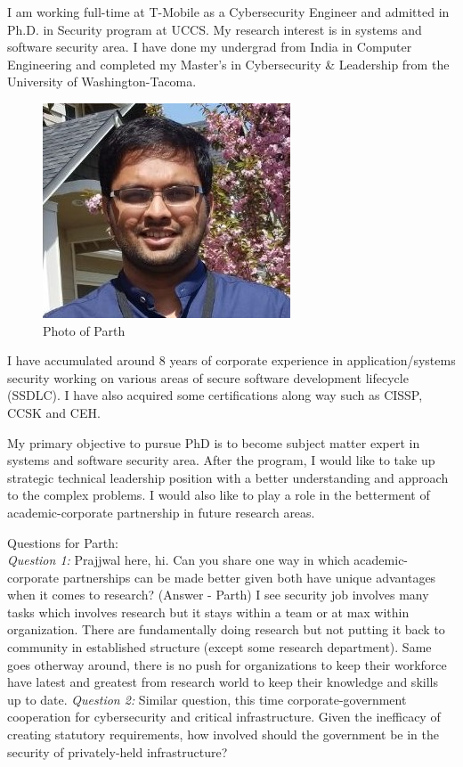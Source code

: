 I am working full-time at T-Mobile as a Cybersecurity Engineer and admitted in Ph.D. in Security program at UCCS. 
My research interest is in systems and software security area. 
I have done my undergrad from India in Computer Engineering and completed my Master’s in Cybersecurity \& Leadership from the University of Washington-Tacoma. 
\begin{figure}[h!]
\centering
\includegraphics[scale=0.5]{parth_shah.jpg}
\caption{Photo of Parth}
\label{fig:profile}
\end{figure}
I have accumulated around 8 years of corporate experience in application/systems security working on various areas of secure software development lifecycle (SSDLC). 
I have also acquired some certifications along way such as CISSP, CCSK and CEH.  


My primary objective to pursue PhD is to become subject matter expert in systems and software security area. 
After the program, I would like to take up strategic technical leadership position with a better understanding and approach to the complex problems. 
I would also like to play a role in the betterment of academic-corporate partnership in future research areas.

Questions for Parth:\\
\textit{Question 1: }Prajjwal here, hi. Can you share one way in which academic-corporate partnerships can be made better given both have unique advantages when it comes to research?
(Answer - Parth) I see security job involves many tasks which involves research but it stays within a team or at max within organization. 
There are fundamentally doing research but not putting it back to community in established structure (except some research department). 
Same goes otherway around, there is no push for organizations to keep their workforce have latest and greatest from research world to keep their knowledge and skills up to date.
\textit{Question 2: }Similar question, this time corporate-government cooperation for cybersecurity and critical infrastructure. Given the inefficacy of creating statutory requirements, how involved should the government be in the security of privately-held infrastructure?
